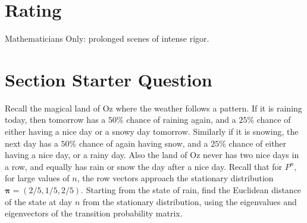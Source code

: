 \documentclass[12pt]{article}
\begin{document}
\myheader \mytitle

\hr


\hr

\usefirefox

\hr



\section*{Rating} %
Mathematicians Only:  prolonged scenes of intense rigor.

\hr

\section*{Section Starter Question}

Recall the magical land of Oz where the weather follows a pattern.  If
it is raining today, then tomorrow has a \( 50\% \) chance of raining
again, and a \( 25\% \) chance of either having a nice day or a snowy
day tomorrow.  Similarly if it is snowing, the next day has a \( 50\% \)
chance of again having snow, and a \( 25\% \) chance of either having a
nice day, or a rainy day.  Also the land of Oz never has two nice days
in a row, and equally has rain or snow the day after a nice day.  Recall
that for \( P^n \), for large values of \( n \), the row vectors
approach the stationary distribution \( \mathbf{\pi}=(2/5,1/5,2/5) \).
Starting from the state of rain, find the Euclidean distance of the
state at day \( n \) from the stationary distribution, using the
eigenvalues and eigenvectors of the transition probability matrix.

\hr

\end{document}
